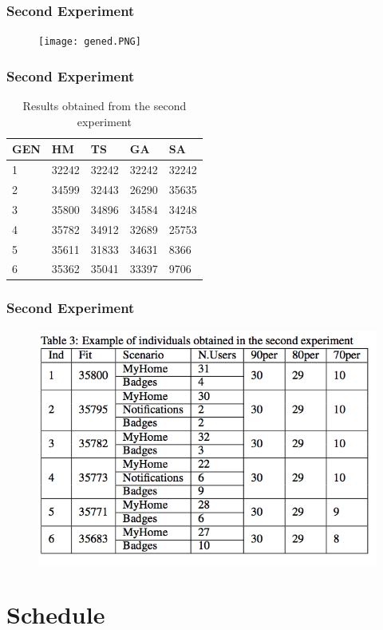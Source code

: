 \documentclass{beamer}
\begin{document}
\begin{frame}
\frametitle{Second Experiment}
\begin{figure}[H]
\centering
\texttt{[image: gened.PNG]}
\end{figure}
\end{frame}


\begin{frame}[allowframebreaks]
\frametitle{Second Experiment}
\begin{table}[h]
\centering
\caption{Results obtained from the second experiment}
\label{tab:secondexperiment}
\begin{tabular}{|l|l|l|l|l|}
\hline
GEN & HM    & TS    & GA    & SA    \\
\hline
1          & 32242 & 32242 & 32242 & 32242 \\
\hline
2          & 34599 & 32443 & 26290 & 35635 \\
\hline
3          & 35800 & 34896 & 34584 & 34248 \\
\hline
4          & 35782 & 34912 & 32689 & 25753 \\
\hline
5          & 35611 & 31833 & 34631 & 8366  \\
\hline
6          & 35362 & 35041 & 33397 & 9706 \\
\hline
\end{tabular}
\end{table}
\end{frame}

\begin{frame}
\frametitle{Second Experiment}
\begin{figure}[H]
\centering
\includegraphics[width=0.8\linewidth]{ind1.PNG}
\end{figure}
\end{frame}

\section{Schedule}
\end{document}
